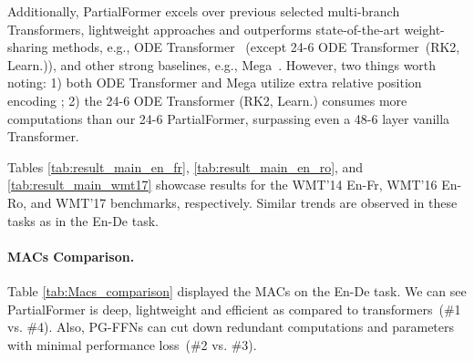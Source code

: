 \documentclass[11pt]{article}
\begin{document}
Additionally, PartialFormer excels over previous selected multi-branch Transformers, lightweight approaches and outperforms state-of-the-art weight-sharing methods, e.g., ODE Transformer~\cite{li-etal-2022-ode} (except 24-6 ODE Transformer~(RK2, Learn.)), and other strong baselines, e.g., Mega~\cite{Ma2022mega}. However, two things worth noting: 1) both ODE Transformer and Mega utilize extra relative position encoding \cite{shaw-etal-2018-self}; 2) the 24-6 ODE Transformer (RK2, Learn.) consumes more computations than our 24-6 PartialFormer, surpassing even a 48-6 layer vanilla Transformer.


Tables \ref{tab:result_main_en_fr}, \ref{tab:result_main_en_ro}, and \ref{tab:result_main_wmt17} showcase results for the WMT'14 En-Fr, WMT'16 En-Ro, and WMT'17 benchmarks, respectively. Similar trends are observed in these tasks as in the En-De task.


\paragraph{MACs Comparison.} Table \ref{tab:Macs_comparison} displayed the MACs on the En-De task. We can see PartialFormer is deep, lightweight and efficient as compared to transformers~(\#1 vs. \#4). Also, PG-FFNs can
cut down redundant computations and parameters
with minimal performance loss~(\#2 vs. \#3).
\end{document}
